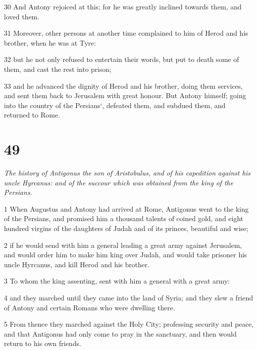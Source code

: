 \par 30 And Antony rejoiced at this; for he was greatly inclined towards them, and loved them. 

\par 31 Moreover, other persons at another time complained to him of Herod and his brother, when he was at Tyre: 

\par 32 but he not only refused to entertain their words, but put to death some of them, and cast the rest into prison; 

\par 33 and he advanced the dignity of Herod and his brother, doing them services, and sent them back to Jerusalem with great honour. But Antony himself; going into the country of the Persians‘, defeated them, and subdued them, and returned to Rome. 

\chapter{49}

\par \textit{The history of Antigonus the son of Aristobulus, and of his capedition against his uncle Hyrcanus: and of the succour which was obtained from the king of the Persians.}

\par 1 When Augustus and Antony had arrived at Rome, Antigonus went to the king of the Persians, and promised him a thousand talents of coined gold, and eight hundred virgins of the daughters of Judah and of its princes, beautiful and wise; 

\par 2 if he would send with him a general leading a great army against Jerusalem, and would order him to make him king over Judah, and would take prisoner his uncle Hyrcanus, and kill Herod and his brother. 

\par 3 To whom the king assenting, sent with him a general with a great army: 

\par 4 and they marched until they came into the land of Syria; and they slew a friend of Antony and certain Romans who were dwelling there. 

\par 5 From thence they marched against the Holy City; professing security and peace, and that Antigonus had only come to pray in the sanctuary, and then would return to his own friends. 

